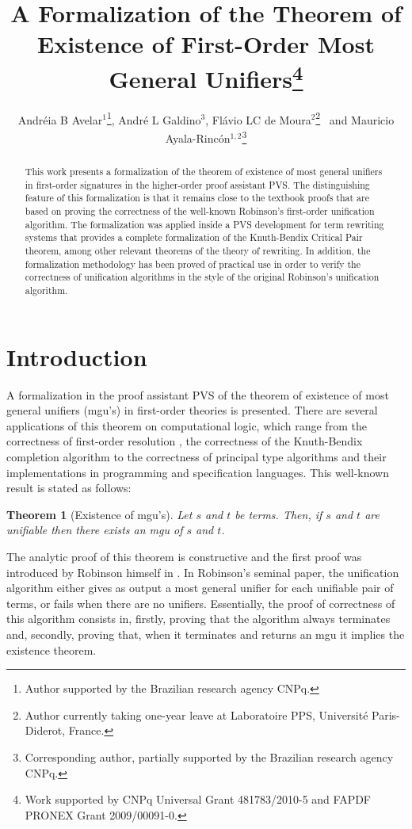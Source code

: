 \documentclass[submission,copyright,creativecommons]{eptcs}
\title{A Formalization of the Theorem of Existence of First-Order Most
  General Unifiers\thanks{Work supported by CNPq Universal Grant 481783/2010-5 and FAPDF PRONEX Grant 2009/00091-0.}}
\author{Andr\'eia B Avelar$^1$\thanks{Author supported by the Brazilian
    research agency CNPq.}, Andr\'{e} L Galdino$^3$, Fl\'avio LC de
  Moura$^{2}$\thanks{Author currently taking one-year leave at Laboratoire PPS,  Universit\'e Paris-Diderot, France.}~
   and Mauricio Ayala-Rinc\'{o}n$^{1,2}$\thanks{Corresponding author, partially supported
    by the Brazilian research agency CNPq.}
\institute{Departamentos de $^1$Matem\'atica e $^2$Ci\^encia da Computa\c{c}\~ao,
  Universidade de Bras\'ilia, Bras\'ilia, Brazil \\
$^3$Departamento de Matem\'atica, 
  Universidade Federal de Goi\'{a}s, Catal\~ao, Brazil} 
\email{\{andreia@mat., flaviomoura@, galdino@, ayala@\}unb.br}
}
\newtheorem{theorem}{Theorem}
\begin{document}
\maketitle

\begin{abstract}
  This work presents a formalization of the theorem of existence of
  most general unifiers in first-order signatures in the higher-order
  proof assistant PVS. The distinguishing feature of this
  formalization is that it remains close to the textbook proofs that
  are based on proving the correctness of the well-known Robinson's
  first-order unification algorithm. The formalization was applied
  inside a PVS development for term rewriting systems that provides a
  complete formalization of the Knuth-Bendix Critical Pair theorem,
  among other relevant theorems of the theory of rewriting. In
  addition, the formalization methodology has been proved of practical
  use in order to verify the correctness of unification algorithms in
  the style of the original Robinson's unification algorithm.
\end{abstract}

\section{Introduction}

A formalization in the proof assistant PVS of the theorem of existence
of most general unifiers (mgu's) in first-order theories is
presented. There are several applications of this theorem on
computational logic, which range from the correctness of first-order
resolution \cite{Ro65}, the correctness of the Knuth-Bendix completion
algorithm \cite{KnBe70} to the correctness of principal type
algorithms \cite{Hi69} and their implementations in programming and
specification languages. This well-known result is stated as follows:

\begin{theorem}[Existence of mgu's]
  \label{existence-mgu}
  Let $s$ and $t$ be terms. Then, if $s$ and $t$ are unifiable then
  there exists an mgu of $s$ and $t$.
\end{theorem}

The analytic proof of this theorem is constructive and the first proof
was introduced by Robinson himself in \cite{Ro65}. In Robinson's
seminal paper, the unification algorithm either gives as output a most
general unifier for each unifiable pair of terms, or fails when there
are no unifiers.  Essentially, the proof of correctness of this
algorithm consists in, firstly, proving that the algorithm always
terminates and, secondly, proving that, when it terminates and returns
an mgu it implies the existence theorem.
\end{document}
